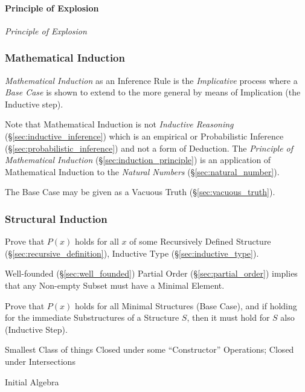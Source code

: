 \paragraph{Principle of Explosion}\label{sec:explosion_principle}\hfill

\emph{Principle of Explosion}



\subsubsection{Mathematical Induction}\label{sec:mathematical_induction}

\emph{Mathematical Induction} as an Inference Rule is the
\emph{Implicative} process where a \emph{Base Case} is shown to extend
to the more general by means of Implication (the Inductive step).

Note that Mathematical Induction is not \emph{Inductive Reasoning}
(\S\ref{sec:inductive_inference}) which is an empirical or
Probabilistic Inference (\S\ref{sec:probabilistic_inference}) and not
a form of Deduction. The \emph{Principle of Mathematical Induction}
(\S\ref{sec:induction_principle}) is an application of Mathematical
Induction to the \emph{Natural Numbers} (\S\ref{sec:natural_number}).

The Base Case may be given as a Vacuous Truth
(\S\ref{sec:vacuous_truth}).



\subsubsection{Structural Induction}\label{sec:structural_induction}

Prove that $P(x)$ holds for all $x$ of some Recursively Defined
Structure (\S\ref{sec:recursive_definition}), Inductive Type
(\S\ref{sec:inductive_type}).

Well-founded (\S\ref{sec:well_founded}) Partial Order
(\S\ref{sec:partial_order}) implies that any Non-empty Subset must
have a Minimal Element.

Prove that $P(x)$ holds for all Minimal Structures (Base Case), and if
holding for the immediate Substructures of a Structure $S$, then it
must hold for $S$ also (Inductive Step). %

Smallest Class of things Closed under some ``Constructor'' Operations;
Closed under Intersections \cite{shulman11}

Initial Algebra %



